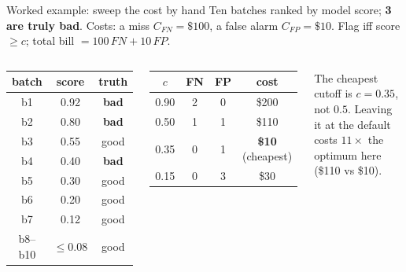 \documentclass[aspectratio=169]{beamer}
\begin{document}
\begin{frame}{Worked example: sweep the cost by hand}
  Ten batches ranked by model score; \textbf{3 are truly bad}. Costs: a miss $C_{FN}=\$100$, a
  false alarm $C_{FP}=\$10$. Flag iff score $\ge c$; total bill $= 100\,FN + 10\,FP$.
  \vfill
  \begin{columns}[T]
    \begin{center}\scriptsize
      \renewcommand{\arraystretch}{1.05}
      \begin{tabular}{c c c}
        batch & score & truth \\ \hline
        b1 & 0.92 & \textbf{bad} \\
        b2 & 0.80 & \textbf{bad} \\
        b3 & 0.55 & good \\
        b4 & 0.40 & \textbf{bad} \\
        b5 & 0.30 & good \\
        b6 & 0.20 & good \\
        b7 & 0.12 & good \\
        b8--b10 & $\le 0.08$ & good \\
      \end{tabular}
    \end{center}
    \begin{center}\small
      \renewcommand{\arraystretch}{1.35}
      \begin{tabular}{c c c c}
        $c$ & FN & FP & \textbf{cost} \\ \hline
        0.90 & 2 & 0 & \$200 \\
        0.50 & 1 & 1 & \$110 \\
        0.35 & 0 & 1 & \textbf{\$10} \;(cheapest) \\
        0.15 & 0 & 3 & \$30 \\
      \end{tabular}
    \end{center}
    \vskip 4pt
    \footnotesize The cheapest cutoff is \textbf{$c = 0.35$}, not $0.5$. Leaving it at the default
    costs \textbf{$11\times$} the optimum here (\$110 vs \$10).
  \end{columns}
  \vfill
\end{frame}
\end{document}
